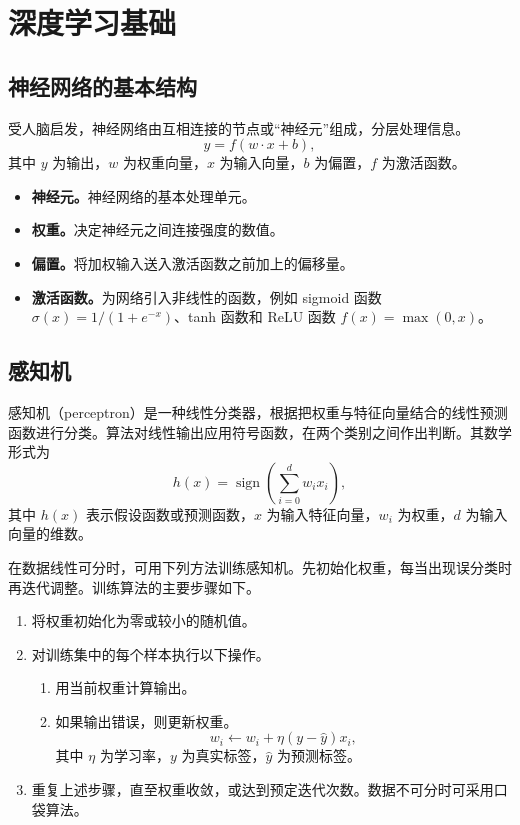 \chapter{深度学习基础}
\label{app:deep-learning}
\chaptercredit{}

\section{神经网络的基本结构}
受人脑启发，神经网络由互相连接的节点或“神经元”组成，分层处理信息。
\begin{equation}
y=f(w\cdot x+b),
\label{eq:appa-neuron}
\end{equation}
其中 $y$ 为输出，$w$ 为权重向量，$x$ 为输入向量，$b$ 为偏置，$f$ 为激活函数。
\begin{itemize}
\item \textbf{神经元。}神经网络的基本处理单元。
\item \textbf{权重。}决定神经元之间连接强度的数值。
\item \textbf{偏置。}将加权输入送入激活函数之前加上的偏移量。
\item \textbf{激活函数。}为网络引入非线性的函数，例如 sigmoid 函数 $\sigma(x)=1/(1+e^{-x})$、tanh 函数和 ReLU 函数 $f(x)=\max(0,x)$。
\end{itemize}

\section{感知机}
\label{sec:appa-perceptron}
感知机（perceptron）是一种线性分类器，根据把权重与特征向量结合的线性预测函数进行分类。算法对线性输出应用符号函数，在两个类别之间作出判断。其数学形式为
\begin{equation}
h(x)=\operatorname{sign}\left(\sum_{i=0}^{d}w_ix_i\right),
\label{eq:appa-perceptron}
\end{equation}
其中 $h(x)$ 表示假设函数或预测函数，$x$ 为输入特征向量，$w_i$ 为权重，$d$ 为输入向量的维数。


在数据线性可分时，可用下列方法训练感知机。先初始化权重，每当出现误分类时再迭代调整。训练算法的主要步骤如下。
\begin{enumerate}
\item 将权重初始化为零或较小的随机值。
\item 对训练集中的每个样本执行以下操作。
  \begin{enumerate}[label=\alph*.]
  \item 用当前权重计算输出。
  \item 如果输出错误，则更新权重。
  \[
  w_i\leftarrow w_i+\eta(y-\hat{y})x_i,
  \]
  其中 $\eta$ 为学习率，$y$ 为真实标签，$\hat{y}$ 为预测标签。
  \end{enumerate}
\item 重复上述步骤，直至权重收敛，或达到预定迭代次数。数据不可分时可采用口袋算法。
\end{enumerate}

